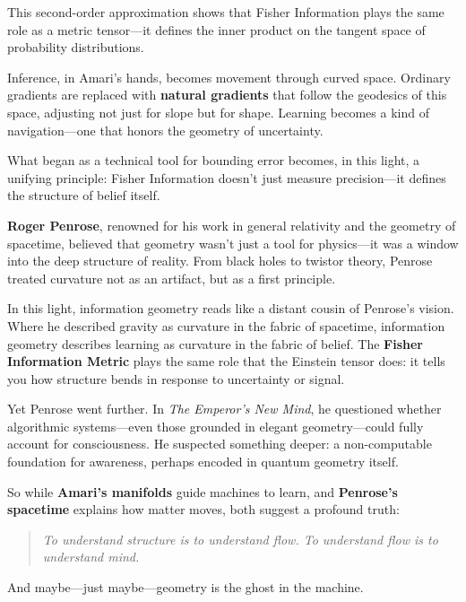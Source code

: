 This second-order approximation shows that Fisher Information plays the same role as a metric tensor—it defines the inner product on the tangent space of probability distributions.

Inference, in Amari’s hands, becomes movement through curved space. Ordinary gradients are replaced with \textbf{natural gradients} that follow the geodesics of this space, adjusting not just for slope but for shape. Learning becomes a kind of navigation—one that honors the geometry of uncertainty.

What began as a technical tool for bounding error becomes, in this light, a unifying principle:  
Fisher Information doesn’t just measure precision—it defines the structure of belief itself.

\begin{tcolorbox}[colback=purple!5!white, colframe=purple!60!black, title=Penrose and the Shape of Thought]

    \textbf{Roger Penrose}, renowned for his work in general relativity and the geometry of spacetime, believed that geometry wasn't just a tool for physics—it was a window into the deep structure of reality. From black holes to twistor theory, Penrose treated curvature not as an artifact, but as a first principle.
    
    In this light, information geometry reads like a distant cousin of Penrose’s vision. Where he described gravity as curvature in the fabric of spacetime, information geometry describes learning as curvature in the fabric of belief. The \textbf{Fisher Information Metric} plays the same role that the Einstein tensor does: it tells you how structure bends in response to uncertainty or signal.
    
    Yet Penrose went further. In \textit{The Emperor’s New Mind}, he questioned whether algorithmic systems—even those grounded in elegant geometry—could fully account for consciousness. He suspected something deeper: a non-computable foundation for awareness, perhaps encoded in quantum geometry itself.
    
    So while \textbf{Amari’s manifolds} guide machines to learn, and \textbf{Penrose’s spacetime} explains how matter moves, both suggest a profound truth:
    
    \begin{quote}
    \emph{To understand structure is to understand flow. To understand flow is to understand mind.}
    \end{quote}
    
    And maybe—just maybe—geometry is the ghost in the machine.
\end{tcolorbox}


